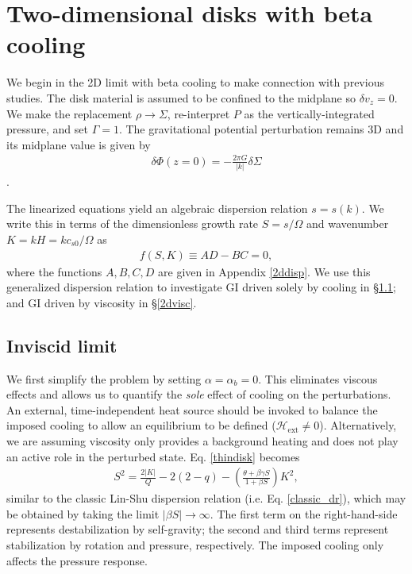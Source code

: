 \section{Two-dimensional disks with beta cooling}\label{result_2d}
We begin in the 2D limit with beta cooling  to make connection 
with previous studies. The disk
material is assumed to be confined to the midplane so $\delta v_z=0$. 
We make the replacement  
$\rho \to \Sigma$, re-interpret $P$ as the vertically-integrated
pressure, and set $\Gamma=1$. %
The gravitational potential perturbation remains 3D and its midplane
value is given by    
\begin{align}
  \delta \Phi(z=0) = -\frac{2 \pi G}{|k|}\delta\Sigma
\end{align}
\citep{shu70}.
 
The linearized equations yield an algebraic dispersion relation $s =
s(k)$. We write this  
in terms of the dimensionless growth rate $S = s/\Omega$ and
wavenumber $K=kH = k c_{s0}/\Omega$ as
\begin{align}\label{thindisk}
  f(S,K)\equiv AD - BC = 0,   
\end{align}
where the functions $A,B,C,D$ are given in Appendix \ref{2ddisp}. 
We use this generalized dispersion relation to investigate GI driven
solely by cooling in \S\ref{2d_inviscid}; and GI driven by viscosity
in \S\ref{2dvisc}. 

\subsection{Inviscid limit}\label{2d_inviscid}
We first simplify the problem by setting $\alpha = \alpha_b = 0$. This
eliminates viscous effects and allows us to quantify the 
\emph{sole} effect of cooling on the 
perturbations. An external, time-independent heat source should be
invoked to balance the imposed cooling to allow an equilibrium to be
defined ($\mathcal{H}_\mathrm{ext}\neq 0$). Alternatively, we are
assuming viscosity only provides a background heating and does not
play an active role in the perturbed state. %
Eq. \ref{thindisk} becomes 
\begin{align}\label{inviscid}
  S^2 = \frac{2|K|}{Q} - 2(2-q) - \left(\frac{\theta + \beta \gamma
    S}{1+\beta S}\right)K^2, 
\end{align}
similar to the classic Lin-Shu dispersion relation
(i.e. Eq. \ref{classic_dr}), which may be obtained by taking the limit
$|\beta S|\to\infty$. %
The first term on the right-hand-side represents destabilization by self-gravity; 
the second and third terms represent stabilization by rotation and
pressure, respectively. The imposed cooling only affects the
pressure response. 

